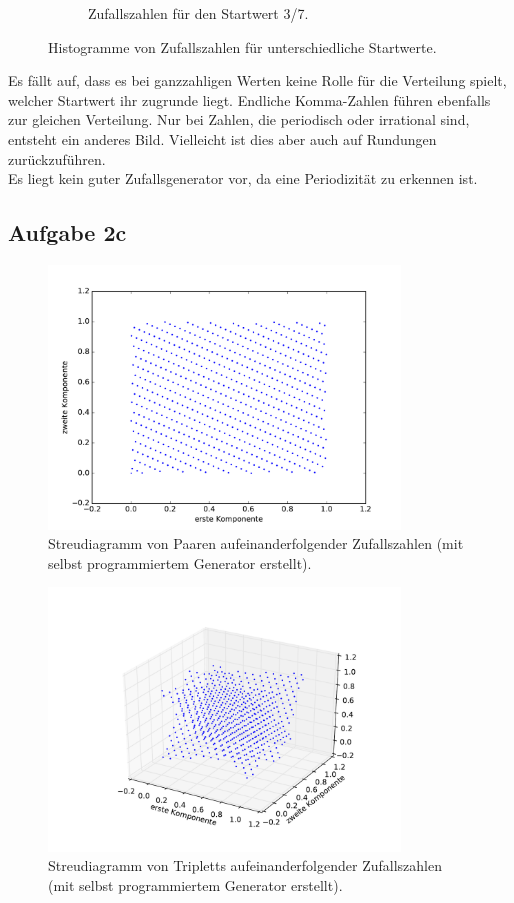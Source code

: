 \begin{figure}[H]
\begin{subfigure}{0.48\textwidth}
        \caption{Zufallszahlen für den Startwert 3/7.}
      \end{subfigure}
      \caption{Histogramme von Zufallszahlen für unterschiedliche Startwerte.}
      \label{fig:histogramme}
    \end{figure}


    Es fällt auf, dass es bei ganzzahligen Werten keine Rolle für die Verteilung
    spielt, welcher Startwert ihr zugrunde liegt. Endliche Komma-Zahlen
    führen ebenfalls zur gleichen Verteilung. Nur bei Zahlen, die periodisch
    oder irrational sind, entsteht ein anderes Bild. Vielleicht ist dies
    aber auch auf Rundungen zurückzuführen. \\
    Es liegt kein guter Zufallsgenerator vor, da eine Periodizität zu erkennen
    ist.


    \subsection{Aufgabe 2c}

    \begin{figure}[H]
      \centering
      \includegraphics[height=7cm]{2D.pdf}
      \caption{Streudiagramm von Paaren aufeinanderfolgender Zufallszahlen
      (mit selbst programmiertem Generator erstellt).}
      \label{fig:2dscatter}
    \end{figure}

    \begin{figure}[H]
      \centering
      \includegraphics[height=7cm]{3D.pdf}
      \caption{Streudiagramm von Tripletts aufeinanderfolgender Zufallszahlen
      (mit selbst programmiertem Generator erstellt).}
      \label{fig:3dscatter}
    \end{figure}


